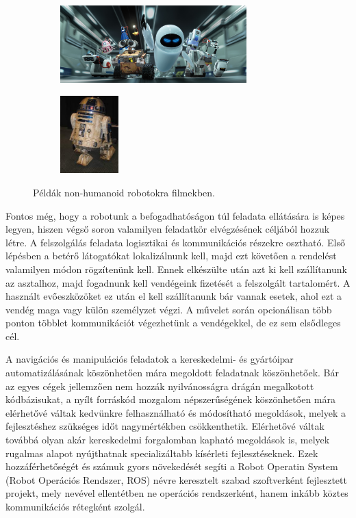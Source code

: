 \begin{figure}
    \centering
    \begin{subfigure}[b]{0.45\linewidth}
        \includegraphics[height=3cm]{figures/non_humanoid_robots/wall_e.jpg}
    \end{subfigure}
    \begin{subfigure}[b]{0.15\linewidth}
        \includegraphics[height=3cm]{figures/non_humanoid_robots/r2d2.jpg}
    \end{subfigure}
    \caption{Példák non-humanoid robotokra filmekben.}
    \label{fig:neural_network_article_numbers}
\end{figure}

Fontos még, hogy a robotunk a befogadhatóságon túl feladata ellátására is képes legyen, hiszen végső soron valamilyen feladatkör elvégzésének céljából hozzuk létre. A felszolgálás feladata logisztikai és kommunikációs részekre osztható. Első lépésben a betérő látogatókat lokalizálnunk kell, majd ezt követően a rendelést valamilyen módon rögzítenünk kell. Ennek elkészülte után azt ki kell szállítanunk az asztalhoz, majd fogadnunk kell vendégeink fizetését a felszolgált tartalomért. A használt evőeszközöket ez után el kell szállítanunk bár vannak esetek, ahol ezt a vendég maga vagy külön személyzet végzi. A művelet során opcionálisan több ponton többlet kommunikációt végezhetünk a vendégekkel, de ez sem elsődleges cél. 

A navigációs és manipulációs feladatok a kereskedelmi- és gyártóipar automatizálásának köszönhetően mára megoldott feladatnak köszönhetőek. Bár az egyes cégek jellemzően nem hozzák nyilvánosságra drágán megalkotott kódbázisukat, a nyílt forráskód mozgalom népszerűségének köszönhetően mára elérhetővé váltak kedvünkre felhasználható és módosítható megoldások, melyek a fejlesztéshez szükséges időt nagymértékben csökkenthetik. Elérhetővé váltak továbbá olyan akár kereskedelmi forgalomban kapható megoldások is, melyek rugalmas alapot nyújthatnak specializáltabb kísérleti fejlesztéseknek. Ezek hozzáférhetőségét és számuk gyors növekedését segíti a Robot Operatin System (Robot Operációs Rendszer, ROS) névre keresztelt szabad szoftverként fejlesztett projekt, mely nevével ellentétben ne operációs rendszerként, hanem inkább köztes kommunikációs rétegként szolgál.

